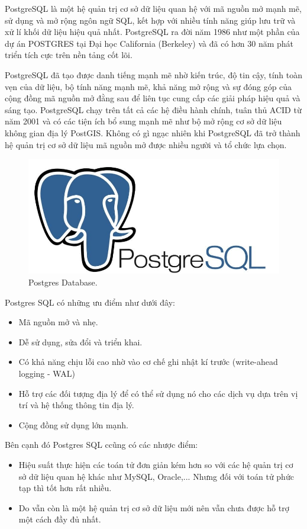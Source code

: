 PostgreSQL là một hệ quản trị cơ sở dữ liệu quan hệ với mã nguồn mở mạnh mẽ, sử dụng và mở rộng ngôn ngữ SQL, kết hợp với nhiều tính năng giúp lưu trữ và xử lí khối dữ liệu hiệu quả nhất. PostgreSQL ra đời năm 1986 như một phần của dự án POSTGRES tại Đại học California (Berkeley) và đã có hơn 30 năm phát triển tích cực trên nền tảng cốt lõi.\par

PostgreSQL đã tạo được danh tiếng mạnh mẽ nhờ kiến trúc, độ tin cậy, tính toàn vẹn của dữ liệu, bộ tính năng mạnh mẽ, khả năng mở rộng và sự đóng góp của cộng đồng mã nguồn mở đằng sau để liên tục cung cấp các giải pháp hiệu quả và sáng tạo. PostgreSQL chạy trên tất cả các hệ điều hành chính, tuân thủ ACID từ năm 2001 và có các tiện ích bổ sung mạnh mẽ như bộ mở rộng cơ sở dữ liệu không gian địa lý PostGIS. Không có gì ngạc nhiên khi PostgreSQL đã trở thành hệ quản trị cơ sở dữ liệu mã nguồn mở được nhiều người và tổ chức lựa chọn.\par

 \begin{figure}[H]
    \begin{center}
        \includegraphics[width=12cm]{Image/Technical/postgresql.png}
        \caption{Postgres Database.}
        \label{postgres}
    \end{center}
\end{figure}

\par
Postgres SQL có những ưu điểm như dưới đây:
\begin{itemize}
    \item Mã nguồn mở và nhẹ.
    \item Dễ sử dụng, sửa đổi và triển khai.
    \item Có khả năng chịu lỗi cao nhờ vào cơ chế ghi nhật kí trước (write-ahead logging - WAL)
    \item Hỗ trợ các đối tượng địa lý để có thể sử dụng nó cho các dịch vụ dựa trên vị trí và hệ thống thông tin địa lý.
    \item Cộng đồng sử dụng lớn mạnh.
\end{itemize}
Bên cạnh đó Postgres SQL ccũng có các nhược điểm:
\begin{itemize}
    \item Hiệu suất thực hiện các toán tử đơn giản kém hơn so với các hệ quản trị cơ sở dữ liệu quan hệ khác như MySQL, Oracle,... Nhưng đối với toán tử phức tạp thì tốt hơn rất nhiều.
    \item Do vẫn còn là một hệ quản trị cơ sở dữ liệu mới nên vẫn chưa được hỗ trợ một cách đầy đủ nhất.
\end{itemize}